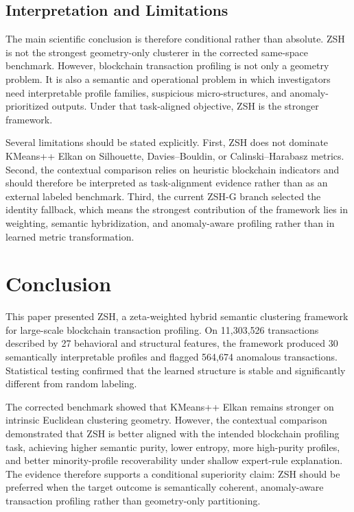 \documentclass{ieeeaccess}
\begin{document}
\FloatBarrier

\subsection{Interpretation and Limitations}

The main scientific conclusion is therefore conditional rather than absolute. ZSH is not the strongest geometry-only clusterer in the corrected same-space benchmark. However, blockchain transaction profiling is not only a geometry problem. It is also a semantic and operational problem in which investigators need interpretable profile families, suspicious micro-structures, and anomaly-prioritized outputs. Under that task-aligned objective, ZSH is the stronger framework.

Several limitations should be stated explicitly. First, ZSH does not dominate KMeans++ Elkan on Silhouette, Davies--Bouldin, or Calinski--Harabasz metrics. Second, the contextual comparison relies on heuristic blockchain indicators and should therefore be interpreted as task-alignment evidence rather than as an external labeled benchmark. Third, the current ZSH-G branch selected the identity fallback, which means the strongest contribution of the framework lies in weighting, semantic hybridization, and anomaly-aware profiling rather than in learned metric transformation.

\section{Conclusion}

This paper presented ZSH, a zeta-weighted hybrid semantic clustering framework for large-scale blockchain transaction profiling. On 11,303,526 transactions described by 27 behavioral and structural features, the framework produced 30 semantically interpretable profiles and flagged 564,674 anomalous transactions. Statistical testing confirmed that the learned structure is stable and significantly different from random labeling.

The corrected benchmark showed that KMeans++ Elkan remains stronger on intrinsic Euclidean clustering geometry. However, the contextual comparison demonstrated that ZSH is better aligned with the intended blockchain profiling task, achieving higher semantic purity, lower entropy, more high-purity profiles, and better minority-profile recoverability under shallow expert-rule explanation. The evidence therefore supports a conditional superiority claim: ZSH should be preferred when the target outcome is semantically coherent, anomaly-aware transaction profiling rather than geometry-only partitioning.
\end{document}

